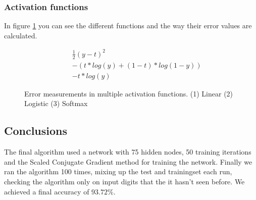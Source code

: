 \documentclass{article}
\begin{document}
\subsubsection{Activation functions}
In figure \ref{fig:errormeasure} you can see the different functions and the way their error values are calculated.

\begin{figure}[H]
	\centering
	\begin{eqnarray}
		&& \frac{1}{2}(y - t)^2 \\
		&&-(t * log(y) + (1 - t) * log(1 - y)) \\
		&& -t * log(y)
	\end{eqnarray}
	\caption{Error measurements in multiple activation functions. (1) Linear (2) Logistic (3) Softmax }
    \label{fig:errormeasure}
\end{figure}

\subsection{Conclusions}
The final algorithm used a network with 75 hidden nodes, 50 training iterations and the Scaled Conjugate Gradient method for training the network. Finally we ran the algorithm 100 times, mixing up the test and trainingset each run, checking the algorithm only on input digits that the it hasn't seen before. We achieved a final accuracy of $93.72\%$.
\end{document}
